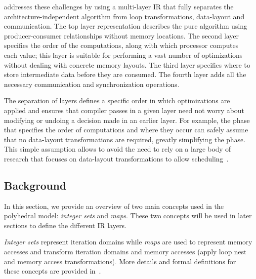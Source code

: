\framework{} addresses these challenges by using a multi-layer IR that fully separates the architecture-independent algorithm from loop transformations, data-layout and communication.
The top layer representation describes the pure algorithm using producer-consumer relationships without memory locations.
The second layer specifies the order of the computations, along with which processor computes each value; this layer is suitable for performing a vast number of optimizations without dealing with concrete memory layouts.
The third layer specifies where to store intermediate data before they are consumed.  The fourth layer adds all the necessary communication and synchronization operations.

The separation of layers defines a specific order in which optimizations are applied and ensures that compiler passes in a given layer need not worry about modifying or undoing a decision made in an earlier layer.  For example, the phase that specifies the order of computations and where they occur can safely assume that no data-layout transformations are required, greatly simplifying the phase.
This simple assumption allows \framework{} to avoid the need to rely on a large body of research that focuses on data-layout transformations to allow scheduling~\cite{gupta1997privatization,autoPrivatPeng,li_array_1992,feautrier_array_1988,midkiff_automatic_2012,maydan_array-data_1993,lefebvre_automatic_1998,Qui00,Darte_contraction_2005}.

\subsection{Background}

In this section, we provide an overview of two main concepts used in the polyhedral model: \emph{integer sets} and \emph{maps}. These two concepts will be used in later sections to define the different IR layers.

\emph{Integer sets} represent iteration domains while \emph{maps} are used to represent memory accesses and transform iteration domains and memory accesses (apply loop nest and memory access transformations).  More details and formal definitions for these concepts are provided in~\cite{verdoolaege_isl:_2010,pencil_pact,polyhedral}.

